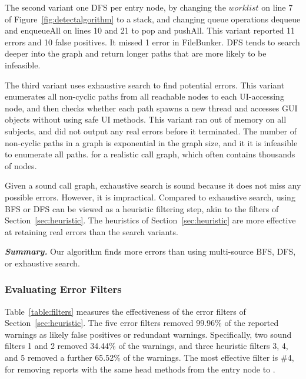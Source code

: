 The second variant one DFS per entry node, by changing
the $\mathit{worklist}$ on line 7 of Figure~\ref{fig:detectalgorithm} to
a stack, and changing queue operations dequeue and enqueueAll
on lines 10 and 21
to pop and pushAll.
This variant reported 11 errors and 10 false positives.  It missed 1 error in FileBunker.
DFS tends to search deeper into the graph and return longer paths that are
more likely to be infeasible.

The third variant uses exhaustive search to find potential errors. This variant
enumerates all non-cyclic paths from all reachable  nodes
to each UI-accessing node, and then checks whether each
path spawns a new thread and accesses GUI objects without using safe UI methods.
This variant ran out of memory on all subjects, and did not output any real
errors before it terminated.  The number of
non-cyclic paths in a graph is exponential in the graph size, and it 
it is infeasible to enumerate all paths.
for a realistic call graph, which often contains thousands of nodes.

Given a sound call graph, exhaustive search is sound because it does not
miss any possible errors.  However, it is impractical.  Compared to
exhaustive search, using BFS or DFS can be viewed as a heuristic filtering
step, akin to the filters of Section~\ref{sec:heuristic}.
 The heuristics of Section~\ref{sec:heuristic} are
more effective at retaining real errors than the search variants.

\vspace{1mm}

\noindent \textbf{\textit{Summary.}} Our algorithm finds more errors than
using multi-source BFS, DFS, or exhaustive search.


\subsubsection{Evaluating Error Filters}
\label{sec:filters}

Table~\ref{table:filters} measures the effectiveness of the
error filters of Section~\ref{sec:heuristic}.
The five error filters removed 99.96\% of the reported warnings as likely false positives
or redundant warnings. Specifically, two sound filters 1 and 2 
removed 34.44\% of the warnings, and three heuristic filters 3, 4, and 5
removed a further 65.52\% of the warnings. The most effective filter is
\#4, for removing reports with the same head methods from the entry node to .

